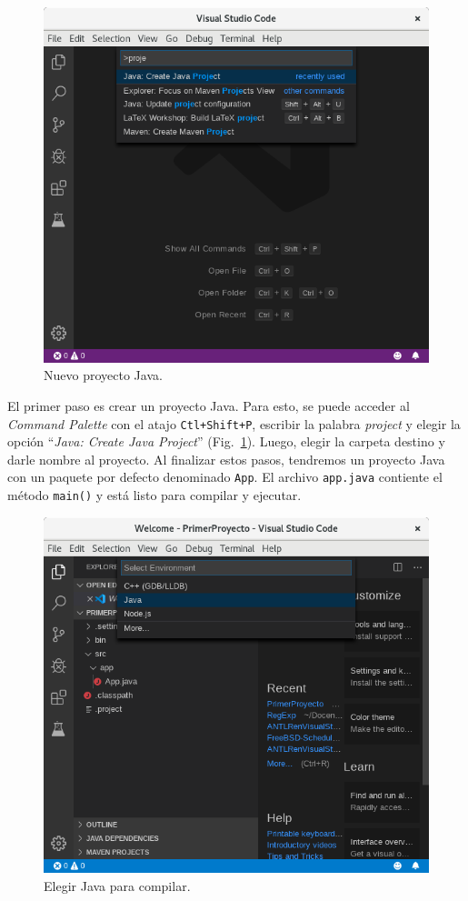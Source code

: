 \documentclass[a5paper,10pt]{article}
\begin{document}
\begin{figure}[t]
	\centering
	\includegraphics[width=.95\textwidth]{NuevoProyecto}
	\caption{Nuevo proyecto Java.}
	\label{maven_nuevo}
\end{figure}


El primer paso es crear un proyecto Java.  Para esto, se puede acceder al \emph{Command Palette} con el atajo \verb|Ctl+Shift+P|, escribir la palabra \emph{project} y elegir la opción ``\emph{Java: Create Java Project}'' (Fig.~\ref{maven_nuevo}). Luego, elegir la carpeta destino y darle nombre al proyecto.  Al finalizar estos pasos, tendremos un proyecto Java con un paquete por defecto denominado \verb|App|.  El archivo \verb|app.java| contiente el método \verb|main()| y está listo para compilar y ejecutar.


\begin{figure}[t]
	\centering
	\includegraphics[width=.95\textwidth]{PrimerCompilacion}
	\caption{Elegir Java para compilar.}
	\label{java_project}
\end{figure}
\end{document}
